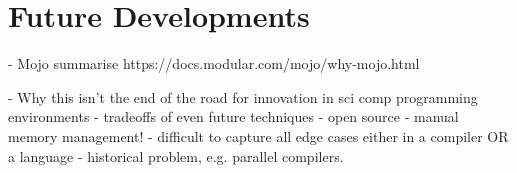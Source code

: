 \section{Future Developments}\label{chpt:1:sec:3}

- Mojo summarise
    https://docs.modular.com/mojo/why-mojo.html

- Why this isn't the end of the road for innovation in sci comp programming environments
    - tradeoffs of even future techniques
        - open source
            - manual memory management!
            - difficult to capture all edge cases either in a compiler OR a language
                - historical problem, e.g. parallel compilers.



